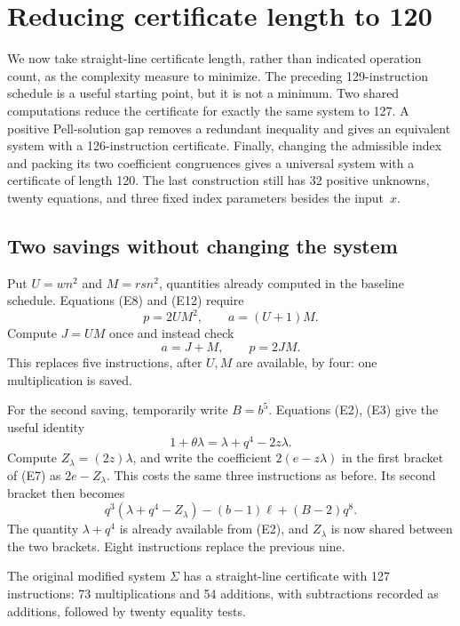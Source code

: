 \section{Reducing certificate length to 120}\label{sec:optimization}

We now take straight-line certificate length, rather than indicated
operation count, as the complexity measure to minimize. The preceding
129-instruction schedule is a useful starting point, but it is not a
minimum. Two shared computations reduce the certificate for exactly the
same system to 127. A positive Pell-solution gap removes a redundant
inequality and gives an equivalent system with a 126-instruction
certificate. Finally, changing the admissible index and packing its two
coefficient congruences gives a universal system with a certificate of
length 120. The last construction still has 32 positive unknowns, twenty
equations, and three fixed index parameters besides the input~$x$.

\subsection{Two savings without changing the system}

Put $U=wn^2$ and $M=rsn^2$, quantities already computed in the baseline
schedule. Equations (E8) and (E12) require
\[
 p=2UM^2,\qquad a=(U+1)M.
\]
Compute $J=UM$ once and instead check
\[
 a=J+M,\qquad p=2JM.
\]
This replaces five instructions, after $U,M$ are available, by four: one
multiplication is saved.

For the second saving, temporarily write $B=b^5$. Equations (E2), (E3)
give the useful identity
\begin{equation}
 1+\theta\lambda=\lambda+q^4-2z\lambda.\label{eq:reuse-theta}
\end{equation}
Compute $Z_\lambda=(2z)\lambda$, and write the coefficient
$2(e-z\lambda)$ in the first bracket of (E7) as $2e-Z_\lambda$.
This costs the same three instructions as before. Its second bracket
then becomes
\[
 q^3(\lambda+q^4-Z_\lambda)-(b-1)\ell+(B-2)q^8.
\]
The quantity $\lambda+q^4$ is already available from (E2), and
$Z_\lambda$ is now shared between the two brackets. Eight instructions
replace the previous nine.

\begin{theorem}\label{thm:127}
The original modified system $\Sigma$ has a straight-line certificate
with 127 instructions: 73 multiplications and 54 additions, with
subtractions recorded as additions, followed by twenty equality tests.
\end{theorem}

